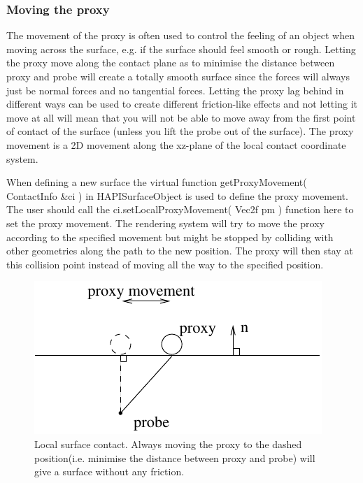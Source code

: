 \subsubsection{Moving the proxy}
The movement of the proxy is often used to control the feeling of an object when moving across the surface, e.g. if the surface should feel smooth or rough. Letting the proxy move along the contact plane as to minimise the distance between proxy and probe will create a totally smooth surface since the forces will always just be normal forces and no tangential forces. Letting the proxy lag behind in different ways can be used to create different friction-like effects and not letting it move at all will mean that you will not be able to move away from the first point of contact of the surface (unless you lift the probe out of the surface). The proxy movement is a 2D movement along the xz-plane of the local contact coordinate system. 

When defining a new surface the virtual function getProxyMovement( ContactInfo \&ci ) in HAPISurfaceObject is used to define the proxy movement. The user should call the ci.setLocalProxyMovement( Vec2f pm ) function here to set the proxy movement. The rendering system will try to move the proxy according to the specified movement but might be stopped by colliding with other geometries along the path to the new position. The proxy will then stay at this collision point instead of moving all the way to the specified position.

\begin{figure} 
  \centering 
  \includegraphics{images/surface.pdf}
  \caption{Local surface contact. Always moving the proxy to the dashed position(i.e. minimise the distance between proxy and probe) will give a surface without any friction.}
  \label{proxy movement} 
\end{figure}

